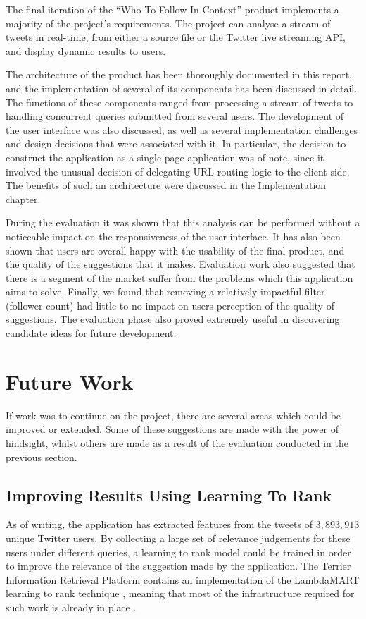 \documentclass{l4proj}
\begin{document}
    The final iteration of the ``Who To Follow In Context'' product implements a majority of the project's requirements. The project can analyse a stream of tweets in real-time, from either a source file or the Twitter live streaming API, and display dynamic results to users.
    
     The architecture of the product has been thoroughly documented in this report, and the implementation of several of its components has been discussed in detail. The functions of these components ranged from processing a stream of tweets to handling concurrent queries submitted from several users. The development of the user interface was also discussed, as well as several implementation challenges and design decisions that were associated with it. In particular, the decision to construct the application as a single-page application was of note, since it involved the unusual decision of delegating URL routing logic to the client-side. The benefits of such an architecture were discussed in the Implementation chapter.
    
     During the evaluation it was shown that this analysis can be performed without a noticeable impact on the responsiveness of the user interface. It has also been shown that users are overall happy with the usability of the final product, and the quality of the suggestions that it makes. Evaluation work also suggested that there is a segment of the market suffer from the problems which this application aims to solve. Finally, we found that removing a relatively impactful filter (follower count) had little to no impact on users perception of the quality of suggestions. The evaluation phase also proved extremely useful in discovering candidate ideas for future development.
    
    \section{Future Work}
    
    If work was to continue on the project, there are several areas which could be improved or extended. Some of these suggestions are made with the power of hindsight, whilst others are made as a result of the evaluation conducted in the previous section.
    
        \subsection{Improving Results Using Learning To Rank}
        As of writing, the application has extracted features from the tweets of $3,893,913$ unique Twitter users. By collecting a large set of relevance judgements for these users under different queries, a learning to rank model could be trained in order to improve the relevance of the suggestion made by the application. The Terrier Information Retrieval Platform contains an implementation of the LambdaMART learning to rank technique \cite{lambdamart}, meaning that most of the infrastructure required for such work is already in place \cite{l2r}.
        
\end{document}
